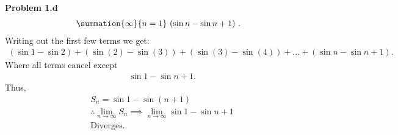 \documentclass{report}
\begin{document}
    \bigbreak \noindent 
    \textbf{Problem 1.d}
    \begin{align*}
        \summation{\infty}{n=1}\ (\sin{n} - \sin{n+1})\ 
    .\end{align*}
    \bigbreak \noindent 
    Writing out the first few terms we get:
    \begin{align*}
        (\sin{1} - \sin{2}) + (\sin{(2)} - \sin{(3)}) + (\sin{(3)} - \sin{(4)}) + ... + (\sin{n} - \sin{n+1})
    .\end{align*}
    \bigbreak \noindent 
    Where all terms cancel except
    \begin{align*}
        &\sin{1} - \sin{n+1}
    .\end{align*}
    \bigbreak \noindent 
    Thus,
    \begin{align*}
        &S_{n} = \sin{1} - \sin{(n+1)} \\
        &\therefore \lim\limits_{n \to \infty}{S_{n}} \implies \lim\limits_{n \to \infty}{\sin{1} - \sin{n+1}}\\
        &\text{Diverges}
    .\end{align*}
\end{document}
